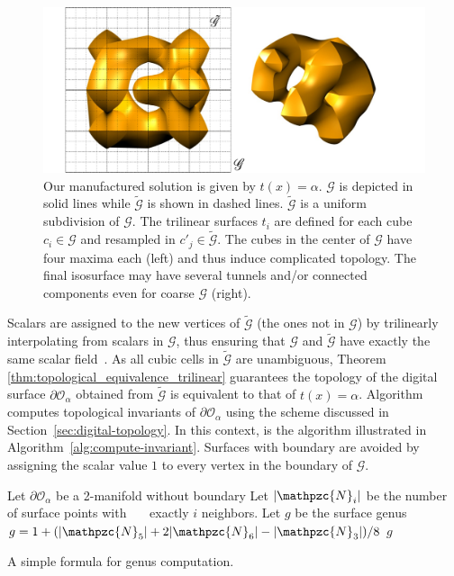 \begin{figure}[t]
\centering
\includegraphics[width=1.0\linewidth,keepaspectratio=true]
{chapter3/figures/trilinear-field.pdf}
\caption{Our manufactured solution is given by $t(x) = \alpha$. $\mathcal{G}$ is
depicted in solid lines while $\tilde{\mathcal{G}}$ is shown in dashed lines.
$\tilde{\mathcal{G}}$ is a uniform subdivision of $\mathcal{G}$. The trilinear
surfaces $t_i$ are defined for each cube
$c_i \in \mathcal{G}$ and resampled in $c'_j \in \tilde{\mathcal{G}}$.
The cubes in the center of $\mathcal{G}$ have four maxima each
(left) and thus induce complicated topology. The final
isosurface may have several tunnels and/or connected
components even for coarse $\mathcal{G}$ (right). }
\label{fig:trilinear-field}
\end{figure}

Scalars are assigned to the new vertices of $\tilde{\mathcal{G}}$ (the ones not in $\mathcal{G}$) by trilinearly 
interpolating
from scalars in $\mathcal{G}$, thus ensuring that $\mathcal{G}$ and  $\tilde{\mathcal{G}}$ have
exactly the same scalar field~\cite{Nielson03onmarching}.
As all cubic cells in $\tilde{\mathcal{G}}$ are unambiguous, Theorem \ref{thm:topological_equivalence_trilinear} guarantees 
the topology of the digital surface $\partial\mathcal{O}_\alpha$
obtained from $\tilde{\mathcal{G}}$ is equivalent to 
that of $t(x)=\alpha$. Algorithm  computes
topological invariants of
$\partial\mathcal{O}_\alpha$ using the scheme discussed in
Section~\ref{sec:digital-topology}. In this context,  is
the algorithm illustrated in Algorithm~\ref{alg:compute-invariant}.
Surfaces with boundary are avoided by assigning the scalar value $1$ to every vertex in the
boundary of $\mathcal{G}$.

\begin{algorithm}[b]
\begin{codebox}
\li \Comment Let $\partial \mathcal{O}_\alpha$ be a 2-manifold without
boundary
\li \Comment Let $|\mathpzc{N}_i|$ be the number of surface points with
\zi ~~~exactly $i$ neighbors.
\li \Comment Let $g$ be the surface genus
\li $g = 1 + (|\mathpzc{N}_5| + 2 |\mathpzc{N}_6| - |\mathpzc{N}_3|) / 8 $
\li \Return $g$
\end{codebox}
\caption{A simple formula for genus computation.}
\label{alg:compute-invariant}
\end{algorithm}


